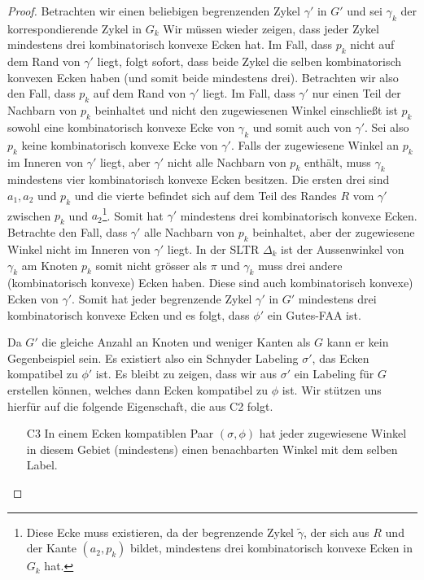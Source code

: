 \begin{proof}
Betrachten wir einen beliebigen begrenzenden Zykel $\gamma'$ in $G'$ und sei $\gamma_k$ der korrespondierende Zykel in $G_k$ Wir müssen wieder zeigen, dass jeder Zykel mindestens drei kombinatorisch konvexe Ecken hat. Im Fall, dass $p_k$ nicht auf dem Rand von $\gamma'$ liegt, folgt sofort, dass beide Zykel die selben kombinatorisch konvexen Ecken haben (und somit beide mindestens drei). Betrachten wir also den Fall, dass $p_k$ auf dem Rand von $\gamma'$ liegt. Im Fall, dass $\gamma'$ nur einen Teil der Nachbarn von $p_k$ beinhaltet und nicht den zugewiesenen Winkel einschließt ist $p_k$ sowohl eine kombinatorisch konvexe Ecke von $\gamma_k$ und somit auch von $\gamma'$. Sei also $p_k$ keine kombinatorisch konvexe Ecke von $\gamma'$. Falls der zugewiesene Winkel an $p_k$ im Inneren von $\gamma'$ liegt, aber $\gamma'$ nicht alle Nachbarn von $p_k$ enthält, muss $\gamma_k$ mindestens vier kombinatorisch konvexe Ecken besitzen. Die ersten drei sind $a_1,a_2$ und $p_k$ und die vierte befindet sich auf dem Teil des Randes $R$ vom $\gamma'$ zwischen $p_k$ und $a_2$\footnote{Diese Ecke muss existieren, da der begrenzende Zykel $\tilde{\gamma}$, der sich aus $R$ und der Kante $(a_2,p_k)$ bildet, mindestens drei kombinatorisch konvexe Ecken in $G_k$ hat.}. Somit hat $\gamma'$ mindestens drei kombinatorisch konvexe Ecken. Betrachte den Fall, dass $\gamma'$ alle Nachbarn von $p_k$ beinhaltet, aber der zugewiesene Winkel nicht im Inneren von $\gamma'$ liegt. In der SLTR $\Delta_k$ ist der Aussenwinkel von $\gamma_k$ am Knoten $p_k$ somit nicht grösser als $\pi$ und $\gamma_k$ muss drei andere (kombinatorisch konvexe) Ecken haben. Diese sind auch kombinatorisch konvexe) Ecken von $\gamma'$. Somit hat jeder begrenzende Zykel $\gamma'$ in $G'$ mindestens drei kombinatorisch konvexe Ecken und es folgt, dass $\phi'$ ein Gutes-FAA ist.

Da $G'$ die gleiche Anzahl an Knoten und weniger Kanten als $G$ kann er kein Gegenbeispiel sein. Es existiert also ein Schnyder Labeling $\sigma'$, das Ecken kompatibel zu $\phi'$ ist. Es bleibt zu zeigen, dass wir aus $\sigma'$ ein Labeling für $G$ erstellen können, welches dann Ecken kompatibel zu $\phi$ ist. Wir stützen uns hierfür auf die folgende Eigenschaft, die aus C2 folgt.

\begin{itemize} 
\item [C3] In einem Ecken kompatiblen Paar $(\sigma,\phi)$ hat jeder zugewiesene Winkel in diesem Gebiet (mindestens) einen benachbarten Winkel mit dem selben Label.
\end{itemize}


\end{proof}
